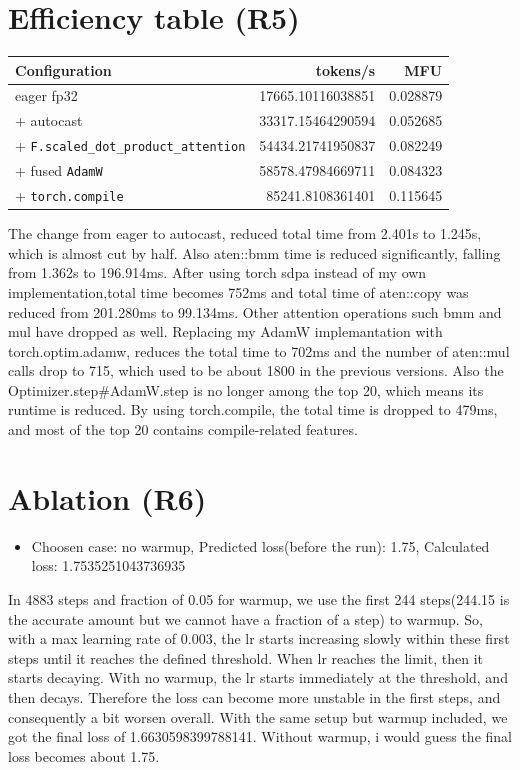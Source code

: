 \documentclass[11pt,a4paper]{article}
\begin{document}
\section{Efficiency table (R5)}
\begin{table}[h]\centering
\begin{tabular}{@{}lrr@{}}\toprule
Configuration & tokens/s & MFU \\\midrule
eager fp32 & 17665.10116038851 & 0.028879\\
+ autocast & 33317.15464290594 & 0.052685\\
+ \texttt{F.scaled\_dot\_product\_attention} & 54434.21741950837 & 0.082249\\
+ fused \texttt{AdamW} & 58578.47984669711 & 0.084323\\
+ \texttt{torch.compile} & 85241.8108361401 & 0.115645\\\bottomrule
\end{tabular}
\end{table}
The change from eager to autocast, reduced total time from 2.401s to 1.245s, which is almost cut by half. Also aten::bmm time is reduced significantly, falling from 1.362s to 196.914ms. \newline
After using torch sdpa instead of my own implementation,total time becomes 752ms and total time of aten::copy was reduced from 201.280ms to 99.134ms. Other attention operations such bmm and mul have dropped as well. \newline
Replacing my AdamW implemantation with torch.optim.adamw, reduces the total time to 702ms and the number of aten::mul calls drop to 715, which used to be about 1800 in the previous versions. Also the Optimizer.step#AdamW.step is no longer among the top 20, which means its runtime is reduced. \newline
By using torch.compile, the total time is dropped to 479ms, and most of the top 20 contains compile-related features.


\section{Ablation (R6)}
\begin{itemize}
\item Choosen case: no warmup, Predicted loss(before the run): 1.75, Calculated loss: 1.7535251043736935
\end{itemize}
In 4883 steps and fraction of 0.05 for warmup, we use the first 244 steps(244.15 is the accurate amount but we cannot have a fraction of a step) to warmup. So, with a max learning rate of 0.003, the lr starts increasing slowly within these first steps until it reaches the defined threshold. When lr reaches the limit, then it starts decaying. With no warmup, the lr starts immediately at the threshold, and then decays.\newline
Therefore the loss can become more unstable in the first steps, and consequently a bit worsen overall. With the same setup but warmup included, we got the final loss of 1.6630598399788141. Without warmup, i would guess the final loss becomes about 1.75.
\end{document}
